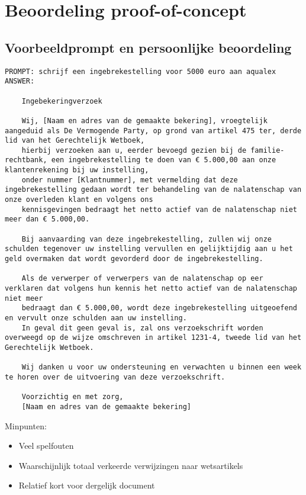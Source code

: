 \section{Beoordeling proof-of-concept}


\subsection{Voorbeeldprompt en persoonlijke beoordeling}
\begin{lstlisting}
PROMPT: schrijf een ingebrekestelling voor 5000 euro aan aqualex
ANSWER:

	Ingebekeringverzoek

	Wij, [Naam en adres van de gemaakte bekering], vroegtelijk aangeduid als De Vermogende Party, op grond van artikel 475 ter, derde lid van het Gerechtelijk Wetboek, 
	hierbij verzoeken aan u, eerder bevoegd gezien bij de familie- rechtbank, een ingebrekestelling te doen van € 5.000,00 aan onze klantenrekening bij uw instelling, 
	onder nummer [Klantnummer], met vermelding dat deze ingebrekestelling gedaan wordt ter behandeling van de nalatenschap van onze overleden klant en volgens ons 
	kennisgevingen bedraagt het netto actief van de nalatenschap niet meer dan € 5.000,00.

	Bij aanvaarding van deze ingebrekestelling, zullen wij onze schulden tegenover uw instelling vervullen en gelijktijdig aan u het geld overmaken dat wordt gevorderd door de ingebrekestelling.

	Als de verwerper of verwerpers van de nalatenschap op eer verklaren dat volgens hun kennis het netto actief van de nalatenschap niet meer 
	bedraagt dan € 5.000,00, wordt deze ingebrekestelling uitgeoefend en vervult onze schulden aan uw instelling. 
	In geval dit geen geval is, zal ons verzoekschrift worden overweegd op de wijze omschreven in artikel 1231-4, tweede lid van het Gerechtelijk Wetboek.

	Wij danken u voor uw ondersteuning en verwachten u binnen een week te horen over de uitvoering van deze verzoekschrift.

	Voorzichtig en met zorg,
	[Naam en adres van de gemaakte bekering]
\end{lstlisting}
\newpage
Minpunten:
\begin {itemize}
\item Veel spelfouten
\item Waarschijnlijk totaal verkeerde verwijzingen naar wetsartikels
\item Relatief kort voor dergelijk document
\end{itemize}

